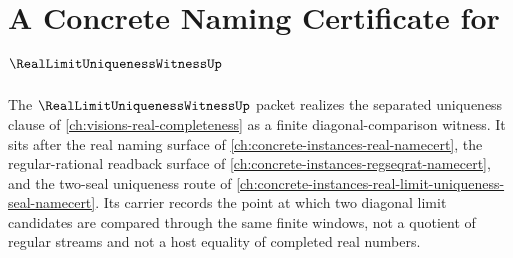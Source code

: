 \chapter{A Concrete Naming Certificate for $\RealLimitUniquenessWitnessUp$}
\label{ch:concrete-instances-real-limit-uniqueness-witness-namecert}

The $\RealLimitUniquenessWitnessUp$ packet realizes the separated uniqueness clause of \autoref{ch:visions-real-completeness} as a finite diagonal-comparison witness. It sits after the real naming surface of \autoref{ch:concrete-instances-real-namecert}, the regular-rational readback surface of \autoref{ch:concrete-instances-regseqrat-namecert}, and the two-seal uniqueness route of \autoref{ch:concrete-instances-real-limit-uniqueness-seal-namecert}. Its carrier records the point at which two diagonal limit candidates are compared through the same finite windows, not a quotient of regular streams and not a host equality of completed real numbers.

